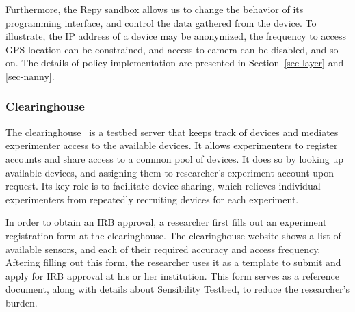 Furthermore, the Repy sandbox allows us to change the 
behavior of its programming interface, and control the 
data gathered from the device. 
To illustrate, the IP address of a device may be anonymized, 
the frequency to access GPS location can be constrained, and 
access to camera can be disabled, and so on. 
The details of policy implementation are presented in 
Section~\ref{sec-layer} and \ref{sec-nanny}.

\subsubsection{Clearinghouse}\label{sec-ch}
The clearinghouse~\cite{ch} is a testbed server that keeps 
track of devices and mediates experimenter access to the 
available devices. It allows experimenters to register 
accounts and share access to a common pool of devices.
It does so by looking up available devices, and assigning
them to researcher's experiment account upon request. 
Its key role is to facilitate device sharing, 
which relieves individual experimenters from repeatedly 
recruiting devices for each experiment.

In order to obtain an IRB approval, a researcher first fills out an experiment
registration form  at the 
clearinghouse. The clearinghouse website shows 
a list of available sensors, and each of their required accuracy 
and access frequency. Aftering filling out this form, the researcher uses it as 
a template to submit and apply for IRB approval at his or her institution. 
This form serves as a reference document, along with details about 
Sensibility Testbed, to reduce the researcher's burden. 

